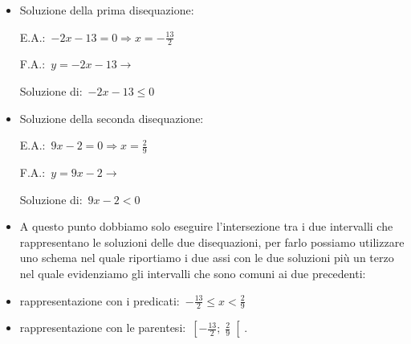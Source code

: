 \begin{esempio}
\begin{itemize} [noitemsep]
 \item Soluzione della prima disequazione:\\
 \begin{minipage}{.45\textwidth}
  E.A.:~$-2 x -13=0 \Rightarrow x=-\frac{13}{2}$
 \end{minipage}
 \begin{minipage}{.25\textwidth}
  F.A.:~$y=-2 x -13 \rightarrow $
 \end{minipage}
 \begin{minipage}{.3\textwidth}
  
 \end{minipage}
 \subitem
  \begin{minipage}{.40\textwidth}
   Soluzione di:~$-2 x -13 \le 0$
  \end{minipage}
  \begin{minipage}{.30\textwidth}
  
  \end{minipage}
 \item Soluzione della seconda disequazione:\\
 \begin{minipage}{.45\textwidth}
  E.A.:~$9 x -2=0 \Rightarrow x=\frac{2}{9}$
 \end{minipage}
 \begin{minipage}{.25\textwidth}
  F.A.:~$y=9 x -2 \rightarrow $
 \end{minipage}
 \begin{minipage}{.3\textwidth}
  
 \end{minipage}
 \subitem
  \begin{minipage}{.40\textwidth}
   Soluzione di:~$9 x -2 < 0$
  \end{minipage}
  \begin{minipage}{.30\textwidth}
  
  \end{minipage}
 \item A questo punto dobbiamo solo eseguire l'intersezione tra i due
intervalli
  che rappresentano le soluzioni delle due disequazioni, per farlo possiamo
  utilizzare uno schema nel quale riportiamo i due assi con le due soluzioni
  più un terzo nel quale evidenziamo gli intervalli che sono comuni ai due
  precedenti:
  
 \item rappresentazione con i predicati:~$-\frac{13}{2} \le x < \frac{2}{9}$
 \item rappresentazione con le parentesi:~$\left[-\frac{13}{2}; \; \frac{2}{9}
\right[$.
\end{itemize}
 \end{esempio}

